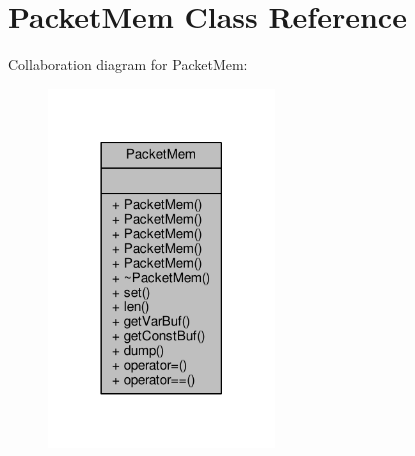 \hypertarget{classPacketMem}{}\section{Packet\+Mem Class Reference}
\label{classPacketMem}


Collaboration diagram for Packet\+Mem\+:
\nopagebreak
\begin{figure}[H]
\begin{center}
\leavevmode
\includegraphics[width=170pt]{d1/d76/classPacketMem__coll__graph}
\end{center}
\end{figure}
